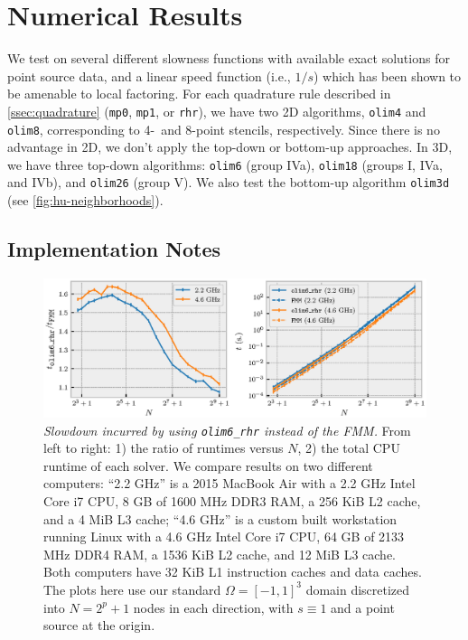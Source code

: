 \documentclass[sisc-eikonal.tex]{subfiles}
\begin{document}
\section{Numerical Results}\label{sec:numerical-results} We test on several different
slowness functions with available exact solutions for point source
data, and a linear speed function (i.e., $1/s$) which has been shown
to be amenable to local factoring. For each quadrature rule described
in \cref{ssec:quadrature} (\texttt{mp0}, \texttt{mp1}, or
\texttt{rhr}), we have two 2D algorithms, \texttt{olim4} and
\texttt{olim8}, corresponding to 4-\ and 8-point stencils,
respectively. Since there is no advantage in 2D, we don't apply the
top-down or bottom-up approaches. In 3D, we have three top-down
algorithms: \texttt{olim6} (group IVa), \texttt{olim18} (groups I,
IVa, and IVb), and \texttt{olim26} (group V). We also test the
bottom-up algorithm \texttt{olim3d} (see \cref{fig:hu-neighborhoods}).

\subsection{Implementation Notes}\label{ssec:impl-notes}

\begin{figure}
  \centering \includegraphics[width=\linewidth]{speed-comparison.eps}%
  \vspace{-1.5em}
  \caption{\emph{Slowdown incurred by using \texttt{olim6\_rhr}
      instead of the FMM.} From left to right: 1) the ratio of
    runtimes versus $N$, 2) the total CPU runtime of each solver. We
    compare results on two different computers: ``2.2 GHz'' is a 2015
    MacBook Air with a 2.2 GHz Intel Core i7 CPU, 8 GB of 1600 MHz
    DDR3 RAM, a 256 KiB L2 cache, and a 4 MiB L3 cache; ``4.6 GHz'' is
    a custom built workstation running Linux with a 4.6 GHz Intel Core
    i7 CPU, 64 GB of 2133 MHz DDR4 RAM, a 1536 KiB L2 cache, and 12
    MiB L3 cache. Both computers have 32 KiB L1 instruction caches and
    data caches. The plots here use our standard $\Omega = [-1, 1]^3$
    domain discretized into $N = 2^p + 1$ nodes in each direction,
    with $s \equiv 1$ and a point source at the
    origin.}\label{fig:speed-comparison}
\end{figure}
\end{document}
